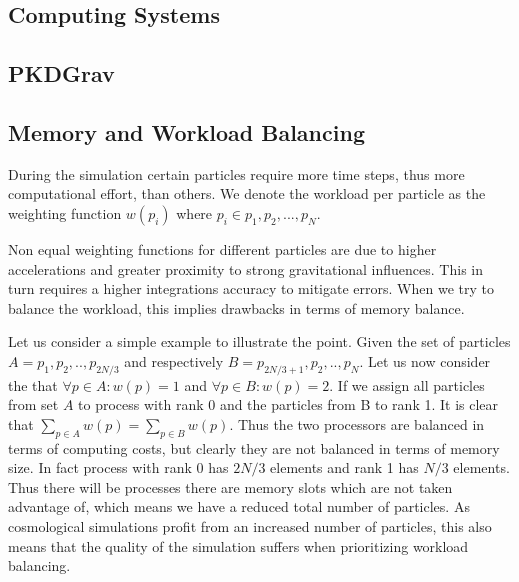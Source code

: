 \documentclass[]{article}
\begin{document}


\subsection{Computing Systems}


\subsection{PKDGrav}


\subsection{Memory and Workload Balancing}\label{sec:balancing}
During the simulation certain particles require more time steps, thus more computational effort, than others. We denote the workload per particle as the weighting function $w(p_i)$ where $p_i \in {p_1, p_2, ..., p_N}$.

Non equal weighting functions for different particles are due to higher accelerations and greater proximity to strong gravitational influences. This in turn requires a higher integrations accuracy to mitigate errors. When we try to balance the workload, this implies drawbacks in terms of memory balance. 

Let us consider a simple example to illustrate the point. Given the set of particles $A = {p_1, p_2, .., p_{2N/3}}$ and respectively $B = {p_{2N/3 + 1}, p_2, .., p_{N}}$. Let us now consider the that $\forall p \in A : w(p) = 1$ and $\forall p \in B : w(p) = 2$. If we assign all particles from set $A$ to process with rank 0 and the particles from B to rank 1. It is clear that $\sum_{p\in A}^{} w(p) = \sum_{p\in B}^{} w(p)$. Thus the two processors are balanced in terms of computing costs, but clearly they are not balanced in terms of memory size. In fact process with rank 0 has $2N/3$ elements and rank 1 has $N/3$ elements. Thus there will be processes there are memory slots which are not taken advantage of, which means we have a reduced total number of particles. As cosmological simulations profit from an increased number of particles, this also means that the quality of the simulation suffers when prioritizing workload balancing.
\end{document}
